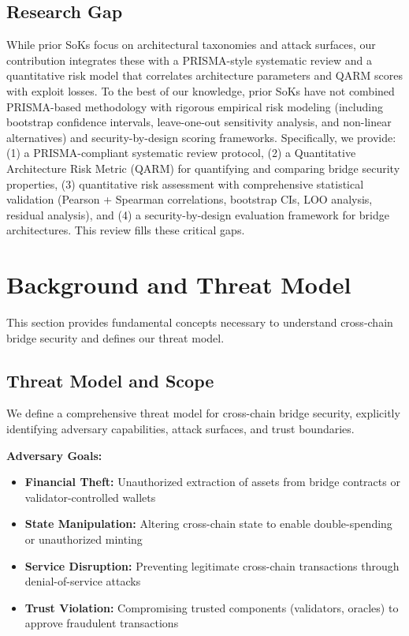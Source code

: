 \documentclass[runningheads]{llncs}
\begin{document}
\subsection{Research Gap}
While prior SoKs focus on architectural taxonomies and attack surfaces, our contribution integrates these with a PRISMA-style systematic review and a quantitative risk model that correlates architecture parameters and QARM scores with exploit losses. To the best of our knowledge, prior SoKs have not combined PRISMA-based methodology with rigorous empirical risk modeling (including bootstrap confidence intervals, leave-one-out sensitivity analysis, and non-linear alternatives) and security-by-design scoring frameworks. Specifically, we provide: (1) a PRISMA-compliant systematic review protocol, (2) a Quantitative Architecture Risk Metric (QARM) for quantifying and comparing bridge security properties, (3) quantitative risk assessment with comprehensive statistical validation (Pearson + Spearman correlations, bootstrap CIs, LOO analysis, residual analysis), and (4) a security-by-design evaluation framework for bridge architectures. This review fills these critical gaps.

\vspace{-0.3cm}
\section{Background and Threat Model}
\label{sec:background}

This section provides fundamental concepts necessary to understand cross-chain bridge security and defines our threat model.

\subsection{Threat Model and Scope}
We define a comprehensive threat model for cross-chain bridge security, explicitly identifying adversary capabilities, attack surfaces, and trust boundaries.

\textbf{Adversary Goals:}
\begin{itemize}
    \item \textbf{Financial Theft:} Unauthorized extraction of assets from bridge contracts or validator-controlled wallets
    \item \textbf{State Manipulation:} Altering cross-chain state to enable double-spending or unauthorized minting
    \item \textbf{Service Disruption:} Preventing legitimate cross-chain transactions through denial-of-service attacks
    \item \textbf{Trust Violation:} Compromising trusted components (validators, oracles) to approve fraudulent transactions
\end{itemize}
\end{document}
